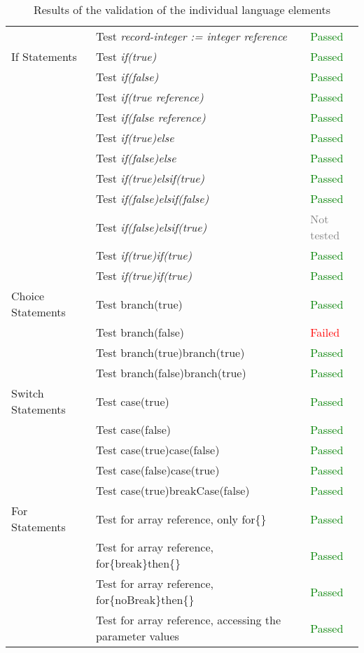 \begin{table}[H]
\begin{tabular}{ l l l }
		& Test \textit{record-integer := integer reference} & \textcolor{green}{Passed}\\
		If Statements & Test \textit{if(true)} & \textcolor{green}{Passed}\\
		& Test \textit{if(false)} & \textcolor{green}{Passed}\\
		& Test \textit{if(true reference)} & \textcolor{green}{Passed}\\
		& Test \textit{if(false reference)} & \textcolor{green}{Passed}\\
		& Test \textit{if(true)else} & \textcolor{green}{Passed}\\
		& Test \textit{if(false)else} & \textcolor{green}{Passed}\\
		& Test \textit{if(true)elsif(true)} & \textcolor{green}{Passed}\\
		& Test \textit{if(false)elsif(false)} & \textcolor{green}{Passed}\\
		& Test \textit{if(false)elsif(true)} & \textcolor{gray}{Not tested}\\
		& Test \textit{if(true){if(true)}} & \textcolor{green}{Passed}\\
		& Test \textit{if(true)if(true)} & \textcolor{green}{Passed}\\
		Choice Statements & Test branch(true) & \textcolor{green}{Passed}\\
		& Test branch(false) & \textcolor{red}{Failed}\\
		& Test branch(true)branch(true) & \textcolor{green}{Passed}\\
		& Test branch(false)branch(true) & \textcolor{green}{Passed}\\
		Switch Statements & Test case(true) & \textcolor{green}{Passed}\\
		& Test case(false) & \textcolor{green}{Passed}\\
		& Test case(true)case(false) & \textcolor{green}{Passed}\\
		& Test case(false)case(true) & \textcolor{green}{Passed}\\
		& Test case(true)breakCase(false) & \textcolor{green}{Passed}\\
		For Statements & Test for array reference, only for\{\} & \textcolor{green}{Passed}\\
		& Test for array reference, for\{break\}then\{\} & \textcolor{green}{Passed}\\
		& Test for array reference, for\{noBreak\}then\{\} & \textcolor{green}{Passed}\\
		& Test for array reference, accessing the parameter values & \textcolor{green}{Passed}\\
		\bottomrule
	\end{tabular}
	\caption{Results of the validation of the individual language elements}
	\label{tab:ValidationTable}
\end{table}

